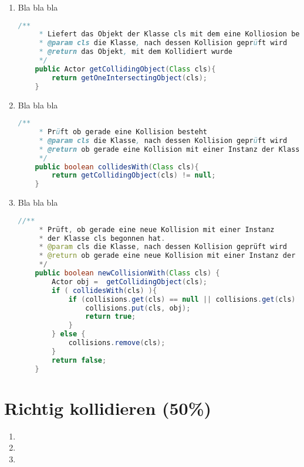 \documentclass{pi1}
\begin{document}
\begin{enumerate}

\item
Bla bla bla
\begin{lstlisting}[caption={\emph{getCollidingObject(Class cls)}-Methode}, firstnumber=25, language=Java]
/**
     * Liefert das Objekt der Klasse cls mit dem eine Kolliosion besteht.
     * @param cls die Klasse, nach dessen Kollision geprüft wird
     * @return das Objekt, mit dem Kollidiert wurde
     */
    public Actor getCollidingObject(Class cls){
        return getOneIntersectingObject(cls);
    }
\end{lstlisting}

\item
Bla bla bla
\begin{lstlisting}[caption={\emph{collidesWith(Class cls)}-Methode}, firstnumber=25, language=Java]
/**
     * Prüft ob gerade eine Kollision besteht
     * @param cls die Klasse, nach dessen Kollision geprüft wird
     * @return ob gerade eine Kollision mit einer Instanz der Klasse cls besteht
     */
    public boolean collidesWith(Class cls){
        return getCollidingObject(cls) != null;
    }
\end{lstlisting}

\item
Bla bla bla
\begin{lstlisting}[caption={\emph{newCollisionWith(Class cls)}-Methode}, firstnumber=25, language=Java]
//**
     * Prüft, ob gerade eine neue Kollision mit einer Instanz
     * der Klasse cls begonnen hat.
     * @param cls die Klasse, nach dessen Kollision geprüft wird
     * @return ob gerade eine neue Kollision mit einer Instanz der Klasse cls begonnen hat
     */
    public boolean newCollisionWith(Class cls) {
        Actor obj =  getCollidingObject(cls);
        if ( collidesWith(cls) ){
            if (collisions.get(cls) == null || collisions.get(cls) != obj ){
                collisions.put(cls, obj);
                return true;
            }
        } else {
            collisions.remove(cls);
        }
        return false;
    }
\end{lstlisting}

\end{enumerate}



\section{Richtig kollidieren (50\%)}



\begin{enumerate}

\item 

\item 

\item 

\end{enumerate}
\end{document}

